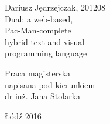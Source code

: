 \begin{titlepage}
\begin{center}
{\Large Dariusz Jędrzejczak, 201208\\}
\vspace{2cm}
{\huge{Dual: a web-based,\\Pac-Man-complete\\hybrid text and visual\\programming language\\}}
\end{center}
\vspace{3cm}
\hfill
\begin{minipage}{.55\columnwidth}
Praca magisterska\\
napisana pod kierunkiem\\
dr inż. Jana Stolarka
\end{minipage}
\vfill
\begin{center}
Łódź 2016
\end{center}
\end{titlepage}
